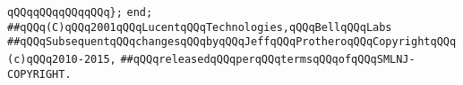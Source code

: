 \newline
\newline
\verb|qQQqqQQqqQQqqQQq};|\newline
\verb|end;|\newline
\newline
\newline
\newline
\verb|##qQQq(C)qQQq2001qQQqLucentqQQqTechnologies,qQQqBellqQQqLabs|\newline
\verb|##qQQqSubsequentqQQqchangesqQQqbyqQQqJeffqQQqProtheroqQQqCopyrightqQQq(c)qQQq2010-2015,|\newline
\verb|##qQQqreleasedqQQqperqQQqtermsqQQqofqQQqSMLNJ-COPYRIGHT.|\newline

